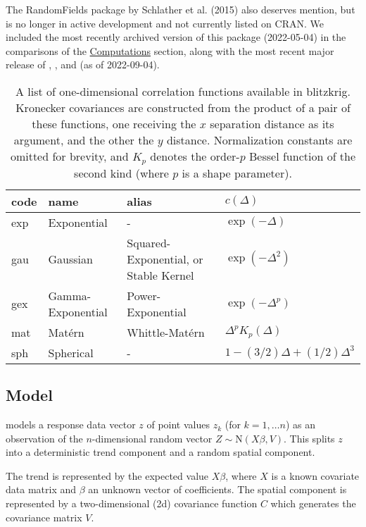 The RandomFields package by Schlather et al. (2015) also deserves mention, but is no longer in active development and not currently listed on CRAN. We included the most recently archived version of this package (2022-05-04) in the comparisons of the \protect\hyperlink{computations}{Computations} section, along with the most recent major release of , , and  (as of 2022-09-04).

\begin{table}

\caption{\label{tab:cfun-table-latex}A list of one-dimensional correlation functions available in blitzkrig. Kronecker covariances are constructed from the product of a pair of these functions, one receiving the $x$ separation distance as its argument, and the other the $y$ distance. Normalization constants are omitted for brevity, and $K_p$ denotes the order-$p$ Bessel function of the second kind (where $p$ is a shape parameter).}
\centering
\fontsize{9}{11}\selectfont
\begin{tabular}[t]{llll}
\toprule
code & name & alias & $c\left( \Delta \right)$\\
\midrule
exp & Exponential & - & $\exp\left( -\Delta \right)$\\
gau & Gaussian & Squared-Exponential, or Stable Kernel & $\exp\left( -\Delta^2 \right)$\\
gex & Gamma-Exponential & Power-Exponential & $\exp\left( -\Delta^p \right)$\\
mat & Mat\'ern & Whittle-Mat\'ern & $\Delta^p K_p\left( \Delta \right)$\\
sph & Spherical & - & $1 - (3/2)\Delta + (1/2)\Delta^3$\\
\bottomrule
\end{tabular}
\end{table}

\hypertarget{model}{%
\subsection{Model}\label{model}}

 models a response data vector \(z\) of point values \(z_k\) (for \(k=1,\dots n\)) as an observation of the \(n\)-dimensional random vector \(Z \sim \text{N} \left( X\beta, V \right)\). This splits \(z\) into a deterministic trend component and a random spatial component.

The trend is represented by the expected value \(X\beta\), where \(X\) is a known covariate data matrix and \(\beta\) an unknown vector of coefficients. The spatial component is represented by a two-dimensional (2d) covariance function \(C\) which generates the covariance matrix \(V\).

